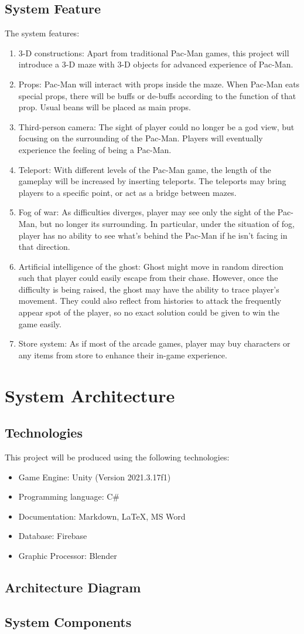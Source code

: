 \documentclass{article}
\begin{document}
\subsection{System Feature}
\par The system features:
\begin{enumerate}
    \item 3-D constructions: Apart from traditional Pac-Man games, this project will introduce a 3-D maze with 3-D objects for advanced experience of Pac-Man.
    \item Props: Pac-Man will interact with props inside the maze. When Pac-Man eats special props, there will be buffs or de-buffs according to the function of that prop. Usual beans will be placed as main props.
    \item Third-person camera: The sight of player could no longer be a god view, but focusing on the surrounding of the Pac-Man. Players will eventually experience the feeling of being a Pac-Man.
    \item Teleport: With different levels of the Pac-Man game, the length of the gameplay will be increased by inserting teleports. The teleports may bring players to a specific point, or act as a bridge between mazes.
    \item Fog of war: As difficulties diverges, player may see only the sight of the Pac-Man, but no longer its surrounding. In particular, under the situation of fog, player has no ability to see what's behind the Pac-Man if he isn't facing in that direction.
    \item Artificial intelligence of the ghost: Ghost might move in random direction such that player could easily escape from their chase. However, once the difficulty is being raised, the ghost may have the ability to trace player's movement. They could also reflect from histories to attack the frequently appear spot of the player, so no exact solution could be given to win the game easily.
    \item Store system: As if most of the arcade games, player may buy characters or any items from store to enhance their in-game experience.
\end{enumerate}
\section{System Architecture}
\subsection{Technologies}
\par This project will be produced using the following technologies:
\begin{itemize}
    \item Game Engine: Unity (Version 2021.3.17f1)
    \item Programming language: C\#
    \item Documentation: Markdown, LaTeX, MS Word
    \item Database: Firebase
    \item Graphic Processor: Blender
\end{itemize}
\subsection{Architecture Diagram}
\subsection{System Components}
\end{document}
